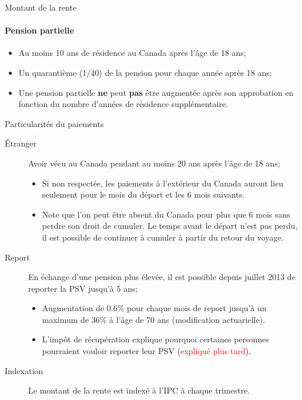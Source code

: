 \documentclass[10pt, french]{article}
\begin{document}
\begin{multicols*}{3}
\begin{conceptgen}{Montant de la rente}
\paragraph*{Pension partielle}
\begin{itemize}[leftmargin = *]
	\item	Au moins 10 ans de résidence au Canada après l'âge de 18 ans;
	\item	Un quarantième (1/40) de la pension pour chaque année après 18 ans;
	\item	Une pension partielle \textbf{ne} peut \textbf{pas} être augmentée après son approbation en fonction du nombre d'années de résidence supplémentaire.
\end{itemize}
\end{conceptgen}

\begin{conceptgen}{Particularités du paiements}
\begin{description}
	\item[Étranger]	Avoir vécu au Canada pendant au moins 20 ans après l'âge de 18 ans;
		\begin{itemize}[leftmargin = *]
		\item 	Si non respectée, les paiements à l'extérieur du Canada auront lieu seulement pour le mois du départ et les 6 mois suivants.
		\item	Note que l'on peut être absent du Canada pour plus que 6 mois sans perdre son droit de cumuler. Le temps avant le départ n'est pas perdu, il est possible de continuer à cumuler à partir du retour du voyage.
		\end{itemize}
	\item[Report] En échange d'une pension plus élevée, il est possible depuis juillet 2013 de reporter la PSV jusqu'à 5 ans;
		\begin{itemize}[leftmargin = *]
		\item	Augmentation de 0.6\% pour chaque mois de report jusqu'à un maximum de 36\% à l'âge de 70 ans (modification actuarielle).
		\item   L'impôt de récupération explique pourquoi certaines personnes pourraient vouloir reporter leur PSV (\textcolor{red}{expliqué plus tard}).
		\end{itemize}
	\item[Indexation]	Le montant de la rente est indexé à l'IPC à chaque trimestre.
\end{description}
\end{conceptgen}


\end{multicols*}
\end{document}
